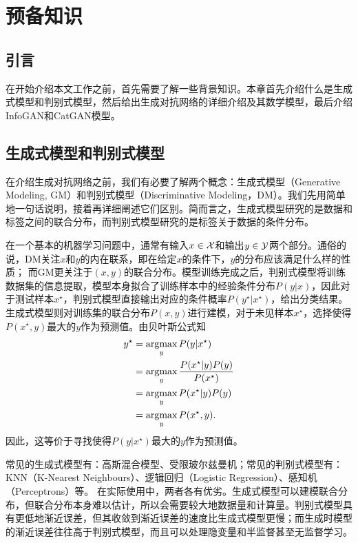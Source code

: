 \chapter{预备知识}\label{chap:preliminaries}
\section{引言}
在开始介绍本文工作之前，首先需要了解一些背景知识。本章首先介绍什么是生成式模型和判别式模型，然后给出生成对抗网络的详细介绍及其数学模型，最后介绍InfoGAN和CatGAN模型。

\section{生成式模型和判别式模型}\label{sec:gm-dm}
在介绍生成对抗网络之前，我们有必要了解两个概念：生成式模型（Generative Modeling, GM）和判别式模型（Discriminative Modeling，DM）。我们先用简单地一句话说明，接着再详细阐述它们区别。简而言之，生成式模型研究的是数据和标签之间的联合分布，而判别式模型研究的是标签关于数据的条件分布。

在一个基本的机器学习问题中，通常有输入$x \in \mathcal{X}$和输出$y \in \mathcal{Y}$两个部分。通俗的说，DM关注$x$和$y$的内在联系，即在给定$x$的条件下，$y$的分布应该满足什么样的性质；
而GM更关注于$(x, y)$的联合分布。模型训练完成之后，判别式模型将训练数据集的信息提取，模型本身拟合了训练样本中的经验条件分布$P(y|x)$，因此对于测试样本$x^{\star}$，判别式模型直接输出对应的条件概率$P(y^{\star} | x^{\star})$，给出分类结果。生成式模型则对训练集的联合分布$P(x,y)$进行建模，对于未见样本$x^{\star}$，选择使得$P(x^{\star}, y)$最大的$y$作为预测值。由贝叶斯公式知
\[
  \begin{split}
    y^{{\star}} &= \mathop{\text{argmax}}_y P(y|x^{{\star}}) \\
       &= \mathop{\text{argmax}}_y \frac{P(x^{\star}|y)P(y)}{P(x^{\star})} \\
       &= \mathop{\text{argmax}}_y P(x^{\star}|y)P(y) \\
       &= \mathop{\text{argmax}}_y P(x^{\star}, y).
  \end{split}
\]
因此，这等价于寻找使得$P(y|x^{\star})$最大的$y$作为预测值。

常见的生成式模型有：高斯混合模型、受限玻尔兹曼机；常见的判别式模型有：KNN（K-Nearest Neighbours）、逻辑回归（Logistic Regression）、感知机（Perceptrons）等。
在实际使用中，两者各有优劣。生成式模型可以建模联合分布，但联合分布本身难以估计，所以会需要较大地数据量和计算量。判别式模型具有更低地渐近误差，但其收敛到渐近误差的速度比生成式模型更慢；而生成时模型的渐近误差往往高于判别式模型\citep{ng2002discriminative}，而且可以处理隐变量和半监督甚至无监督学习。


